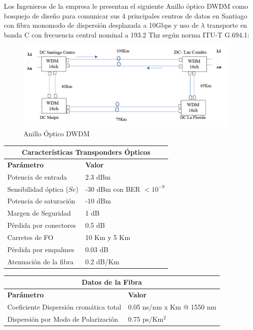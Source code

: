 
Los Ingenieros de la empresa le presentan el siguiente Anillo óptico DWDM como bosquejo de diseño para comunicar sus 4 principales centros de datos en Santiago con fibra monomodo de dispersión desplazada a 10Gbps y uso de $\lambda$ transporte en banda C con frecuencia central nominal a 193.2 Thz según norma ITU-T G.694.1:
\begin{figure}
	\centering
	\includegraphics[width=0.7\linewidth]{img/ejemplos/Figure_1}
	\caption{Anillo Óptico DWDM}
	\label{fig:anillo}
\end{figure}
\begin{table}[h!]
	\centering
	\begin{tabular}{|l|l|}
	\hline
	\multicolumn{2}{|c|}{\textbf{Características Transponders Ópticos}} \\ \hline
	\textbf{Parámetro}                  & \textbf{Valor}                 \\ \hline
	Potencia de entrada                 & 2.3 dBm                        \\ \hline
	Sensibilidad óptica ($Se$)          & -30 dBm con BER $< 10^{-9}$    \\ \hline
	Potencia de saturación              & -10 dBm                        \\ \hline
	Margen de Seguridad                 & 1 dB                           \\ \hline
	Pérdida por conectores              & 0.5 dB                         \\ \hline
	Carretes de FO                      & 10 Km y 5 Km                   \\ \hline
	Pérdida por empalmes                & 0.03 dB                        \\ \hline
	Atenuación de la fibra              & 0.2 dB/Km                      \\ \hline
	\end{tabular}
	\end{table}
	
	\begin{table}[h!]
	\centering
	\begin{tabular}{|l|l|}
	\hline
	\multicolumn{2}{|c|}{\textbf{Datos de la Fibra}} \\ \hline
	\textbf{Parámetro}                         & \textbf{Valor}        \\ \hline
	Coeficiente Dispersión cromática total     & 0.05 ns/nm x Km @ 1550 nm \\ \hline
	Dispersión por Modo de Polarización        & 0.75 ps/Km$^2$        \\ \hline
	\end{tabular}
	\end{table}
	
